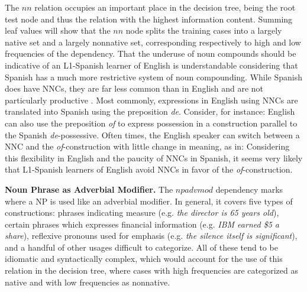 \documentclass[main.tex]{subfiles}
\begin{document}
The $nn$ relation occupies an important place in the decision tree, being the root test node and thus the relation with the highest information content. Summing leaf values will show that the $nn$ node splits the training cases into a largely native set and a largely nonnative set, corresponding respectively to high and low frequencies of the dependency. That the underuse of noun compounds should be indicative of an L1-Spanish learner of English is understandable considering that Spanish has a much more restrictive system of noun compounding. While Spanish does have NNCs, they are far less common than in English and are not particularly productive \citep{piera:1995}. Most commonly, expressions in English using NNCs are translated into Spanish using the preposition \textit{de}. Consider, for instance:
English can also use the preposition \textit{of} to express possession in a construction parallel to the Spanish \textit{de}-possessive. Often times, the English speaker can switch between a NNC and the \textit{of}-construction with little change in meaning, as in:
Considering this flexibility in English and the paucity of NNCs in Spanish, it seems very likely that L1-Spanish learners of English avoid NNCs in favor of the \textit{of}-construction.


\textbf{Noun Phrase as Adverbial Modifier.} The $npadvmod$ dependency marks where a NP is used like an adverbial modifier. In general, it covers five types of constructions: phrases indicating measure (e.g. \textit{the director is 65 years old}), certain phrases which expresses financial information (e.g. \textit{IBM earned \$5 a share}), reflexive pronouns used for emphasis (e.g. \textit{the silence itself is significant}), and a handful of other usages difficult to categorize. All of these tend to be idiomatic and syntactically complex, which would account for the use of this relation in the decision tree, where cases with high frequencies are categorized as native and with low frequencies as nonnative.
\end{document}

